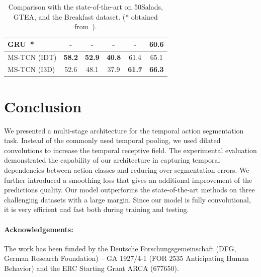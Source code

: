 \documentclass[10pt,twocolumn,letterpaper]{article}
\begin{document}
\begin{table}[tb]
{\begin{tabular}{lccccc}
GRU~\cite{richard2017weakly}* &          -    &          -    &          -    &          -    &         60.6  \\ 
\hline
MS-TCN (IDT)                  & \textbf{58.2} & \textbf{52.9} & \textbf{40.8} &         61.4  &         65.1  \\      
MS-TCN (I3D)                  &         52.6  &         48.1  &         37.9  & \textbf{61.7} & \textbf{66.3} \\      
\hline
\end{tabular}%
}
\caption{Comparison with the state-of-the-art on 50Salads, GTEA, and the Breakfast dataset. (* obtained from~\cite{ding2018weakly}).}
\label{tab:state_of_the_art}
\vspace{-4mm}
\end{table}

\section{Conclusion}

We presented a multi-stage architecture for the temporal action segmentation task. 
Instead of the commonly used temporal pooling, we used dilated convolutions to increase 
the temporal receptive field. The experimental evaluation demonstrated the capability of 
our architecture in capturing temporal dependencies between action classes and reducing 
over-segmentation errors. We further introduced a smoothing loss that gives an additional 
improvement of the predictions quality. Our model outperforms the state-of-the-art methods 
on three challenging datasets with a large margin. Since our model is fully convolutional, 
it is very efficient and fast both during training and testing.

\paragraph{Acknowledgements:} The work has been funded by the Deutsche Forschungsgemeinschaft (DFG, German Research Foundation) – GA 1927/4-1 (FOR 2535 Anticipating Human Behavior) and the ERC Starting Grant ARCA (677650).


{\small


}
\end{document}
